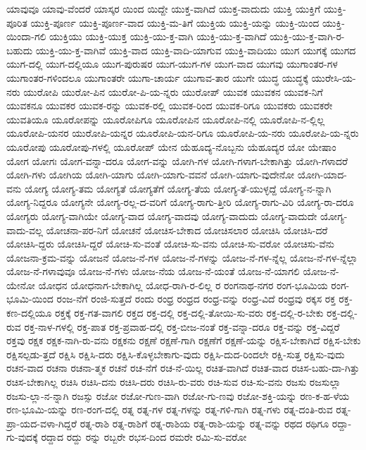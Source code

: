 {ಯಾವುವೂ
ಯಾವು-ವೆಂದರೆ
ಯಾಸ್ಕರ
ಯಿಂದ
ಯಿದ್ದೇ
ಯುಕ್ತ-ವಾಗಿದೆ
ಯುಕ್ತ-ವಾದುದು
ಯುಕ್ತಿ
ಯುಕ್ತಿಗೆ
ಯುಕ್ತಿ-ಪೂರಿತ
ಯುಕ್ತಿ-ಪೂರ್ಣ
ಯುಕ್ತಿ-ಪೂರ್ಣ-ವಾದ
ಯುಕ್ತಿ-ಮ-ತಿಗೆ
ಯುಕ್ತಿಯ
ಯುಕ್ತಿ-ಯನ್ನು
ಯುಕ್ತಿ-ಯಿಂದ
ಯುಕ್ತಿ-ಯಿಂದಾ-ಗಲಿ
ಯುಕ್ತಿಯು
ಯುಕ್ತಿ-ಯುಕ್ತ
ಯುಕ್ತಿ-ಯು-ಕ್ತ-ವಾಗಿ
ಯುಕ್ತಿ-ಯು-ಕ್ತ-ವಾಗಿದೆ
ಯುಕ್ತಿ-ಯು-ಕ್ತ-ವಾಗಿ-ರ-ಬಹುದು
ಯುಕ್ತಿ-ಯು-ಕ್ತ-ವಾಗಿವೆ
ಯುಕ್ತಿ-ವಾದ
ಯುಕ್ತಿ-ವಾದಿ-ಯಾಗುವ
ಯುಕ್ತಿ-ವಾದಿಯು
ಯುಗ
ಯುಗಕ್ಕೆ
ಯುಗದ
ಯುಗ-ದಲ್ಲಿ
ಯುಗ-ದಲ್ಲಿಯೂ
ಯುಗ-ಪುರುಷರ
ಯುಗ-ಯುಗ-ಗಳ
ಯುಗ-ವಾದ
ಯುಗವು
ಯುಗಾಂತರ-ಗಳ
ಯುಗಾಂತರ-ಗಳಿಂದಲೂ
ಯುಗಾಂತರೇ
ಯುಗಾ-ಚಾರ್ಯ
ಯುಗಾವ-ತಾರ
ಯುಗೇ
ಯುದ್ಧ
ಯುದ್ಧಕ್ಕೆ
ಯುರೇಸಿ-ಯ-ನರು
ಯುರೋಪಿ
ಯುರೋ-ಪಿನ
ಯುರೋ-ಪಿ-ಯ-ನ್ನರು
ಯುರೋಪ್
ಯುವಕ
ಯುವಕನ
ಯುವಕ-ನಿಗೆ
ಯುವಕನೂ
ಯುವಕರ
ಯುವಕ-ರನ್ನು
ಯುವಕ-ರಲ್ಲಿ
ಯುವಕ-ರಿಂದ
ಯುವಕ-ರಿಗೂ
ಯುವಕರು
ಯುವಕರೇ
ಯುವತಿಯೂ
ಯೂರೋಪನ್ನು
ಯೂರೋಪಿಗೂ
ಯೂರೋಪಿನ
ಯೂರೋಪಿ-ನಲ್ಲಿ
ಯೂರೋಪಿ-ನ-ಲ್ಲಿಲ್ಲ
ಯೂರೋಪಿ-ಯನರ
ಯುರೋಪಿ-ಯನ್ನರ
ಯೂರೋಪಿ-ಯನ-ರಿಗೂ
ಯೂರೋಪಿ-ಯ-ನರು
ಯೂರೋಪಿ-ಯ-ನ್ನರು
ಯೂರೋಪು
ಯೂರೋಪು-ಗಳಲ್ಲಿ
ಯೂರೋಪ್
ಯೇನ
ಯೆಹೂದ್ಯ-ನೊಬ್ಬನು
ಯೆಹೂದ್ಯರ
ಯೋ
ಯೇಷಾಂ
ಯೋಗ
ಯೋಗಃ
ಯೋಗ-ವನ್ನಾ-ದರೂ
ಯೋಗ-ವನ್ನು
ಯೋಗಿ-ಗಳ
ಯೋಗಿ-ಗಳಾಗ-ಬೇಕಾಗಿತ್ತು
ಯೋಗಿ-ಗಳಾದರೆ
ಯೋಗಿ-ಗಳು
ಯೋಗಿಯ
ಯೋಗಿ-ಯಾಗು
ಯೋಗಿ-ಯಾಗು-ವವನೆ
ಯೋಗಿ-ಯಾಗು-ವುದೇನೋ
ಯೋಗಿ-ಯಾದ-ವನು
ಯೋಗ್ಯ
ಯೋಗ್ಯ-ತಮ
ಯೋಗ್ಯತೆ
ಯೋಗ್ಯತೆಗೆ
ಯೋಗ್ಯ-ತೆಯ
ಯೋಗ್ಯ-ತೆ-ಯುಳ್ಳದ್ದೆ
ಯೋಗ್ಯ-ನ-ನ್ನಾಗಿ
ಯೋಗ್ಯ-ನಿದ್ದರೂ
ಯೋಗ್ಯನೇ
ಯೋಗ್ಯ-ರಲ್ಲ-ದ-ವರಿಗೆ
ಯೋಗ್ಯ-ರಾಗು-ತ್ತೀರಿ
ಯೋಗ್ಯ-ರಾಗು-ವಿರಿ
ಯೋಗ್ಯ-ರಾ-ದರೂ
ಯೋಗ್ಯರು
ಯೋಗ್ಯ-ವಾಗಿಯೇ
ಯೋಗ್ಯ-ವಾದ
ಯೋಗ್ಯ-ವಾದವು
ಯೋಗ್ಯ-ವಾದುದು
ಯೋಗ್ಯ-ವಾದುದೇ
ಯೋಗ್ಯ-ವಾದು-ವಲ್ಲ
ಯೋಚನಾ-ಪರ-ನಿಗೆ
ಯೋಚನೆ
ಯೋಚಿಸ-ಬೇಕಾದ
ಯೋಚಿಸಲಾರ
ಯೋಚಿಸಿ
ಯೋಚಿಸಿ-ದರೆ
ಯೋಚಿಸಿ-ದ್ದರು
ಯೋಚಿಸಿ-ದ್ದರೆ
ಯೋಚಿ-ಸು-ವಂತೆ
ಯೋಚಿ-ಸು-ವನು
ಯೋಚಿ-ಸು-ವರೋ
ಯೋಚಿಸು-ವೆನು
ಯೋಜನಾ-ಕ್ರಮ-ವನ್ನು
ಯೋಜನೆ
ಯೋಜ-ನೆ-ಗಳ
ಯೋಜ-ನೆ-ಗಳನ್ನು
ಯೋಜ-ನೆ-ಗಳ-ನ್ನೆಲ್ಲ
ಯೋಜ-ನೆ-ಗಳ-ನ್ನೆಲ್ಲಾ
ಯೋಜ-ನೆ-ಗಳಾವುವೂ
ಯೋಜ-ನೆ-ಗಳು
ಯೋಜ-ನೆಯ
ಯೋಜ-ನೆ-ಯಂತೆ
ಯೋಜ-ನೆ-ಯಾಗಲಿ
ಯೋಜ-ನೆ-ಯೇನೋ
ಯೋಧನ
ಯೋಧನಾಗ-ಬೇಕಾಗಿಲ್ಲ
ಯೋಧ-ರಾಗಿ-ರ-ಲಿಲ್ಲ
ರ
ರಂಗನಾಥ-ನಗರ
ರಂಗ-ಭೂಮಿಯ
ರಂಗ-ಭೂಮಿ-ಯಿಂದ
ರಂಜ-ನೆಗೆ
ರಂಜಿ-ಸುತ್ತದೆ
ರಂದು
ರಂಧ್ರ
ರಂಧ್ರದ
ರಂಧ್ರ-ವನ್ನು
ರಂಧ್ರ-ವಿದೆ
ರಂಧ್ರವು
ರಕ್ಕಸ
ರಕ್ತ
ರಕ್ತ-ಕಣ-ದಲ್ಲಿಯೂ
ರಕ್ತಕ್ಕೆ
ರಕ್ತ-ಗತ-ವಾಗಲಿ
ರಕ್ತದ
ರಕ್ತ-ದಲ್ಲಿ
ರಕ್ತ-ದಲ್ಲಿ-ತೋಯಿ-ಸು-ವರು
ರಕ್ತ-ದಲ್ಲಿ-ರ-ಬೇಕು
ರಕ್ತ-ದಲ್ಲಿ-ರುವ
ರಕ್ತ-ನಾಳ-ಗಳಲ್ಲಿ
ರಕ್ತ-ಪಾತ
ರಕ್ತ-ಪ್ರವಾಹ-ದಲ್ಲಿ
ರಕ್ತ-ಬೀಜ-ನಂತೆ
ರಕ್ತ-ವನ್ನಾ-ದರೂ
ರಕ್ತ-ವನ್ನು
ರಕ್ತ-ವಿದ್ದರೆ
ರಕ್ತವು
ರಕ್ಷಕ
ರಕ್ಷಕ-ನಾಗಿ-ರು-ವನು
ರಕ್ಷಕನು
ರಕ್ಷಣೆ
ರಕ್ಷಣೆ-ಗಾಗಿ
ರಕ್ಷಣೆಗೆ
ರಕ್ಷಣೆ-ಯನ್ನು
ರಕ್ಷಿಸ-ಬೇಕಾಗಿದೆ
ರಕ್ಷಿಸ-ಬೇಕು
ರಕ್ಷಿಸಲ್ಪಡು-ತ್ತದೆ
ರಕ್ಷಿಸಿ
ರಕ್ಷಿಸಿ-ದರು
ರಕ್ಷಿಸಿ-ಕೊಳ್ಳಬೇಕಾಗು-ವುದು
ರಕ್ಷಿಸಿ-ದುದ-ರಿಂದಲೇ
ರಕ್ಷಿ-ಸುತ್ತ
ರಕ್ಷಿಸು-ವುದು
ರಚನ-ವಾದ
ರಚನಾ
ರಚನಾ-ತ್ಮಕ
ರಚನೆ
ರಚ-ನೆಗೆ
ರಚ-ನೆ-ಯಿಲ್ಲ
ರಚಿತ-ವಾಗಿದೆ
ರಚಿತ-ವಾದ
ರಚಿಸ-ಬಹು-ದಾ-ಗಿತ್ತು
ರಚಿಸ-ಬೇಕಾಗಿಲ್ಲ
ರಚಿಸಿ
ರಚಿಸಿ-ದನು
ರಚಿಸಿ-ದರು
ರಚಿಸಿ-ರು-ವರು
ರಚಿ-ಸುವ
ರಚಿ-ಸು-ವನು
ರಜಸು
ರಜಸುಲ್ಲಾ
ರಜಸು-ಲ್ಲಾ-ನ-ನ್ನಾಗಿ
ರಜಸ್ಸು
ರಜೋ
ರಜೋ-ಗುಣ-ವಾಗಿ
ರಜೋ-ಗು-ಣವು
ರಜೋ-ಶಕ್ತಿ-ಯನ್ನು
ರಣ-ಕ-ಹ-ಳೆಯ
ರಣ-ಭೂಮಿ-ಯನ್ನು
ರಣ-ರಂಗ-ದಲ್ಲಿ
ರತ್ನ
ರತ್ನ-ಗಳ
ರತ್ನ-ಗಳನ್ನು
ರತ್ನ-ಗಳಿ-ಗಾಗಿ
ರತ್ನ-ಗಳು
ರತ್ನ-ದಂತಿ-ರುವ
ರತ್ನ-ಪ್ರಾ-ಯದ-ವಳಾ-ಗಿದ್ದರೆ
ರತ್ನ-ರಾಶಿ
ರತ್ನ-ರಾಶಿಗೆ
ರತ್ನ-ರಾಶಿಯ
ರತ್ನ-ರಾಶಿ-ಯನ್ನು
ರತ್ನ-ವನ್ನು
ರಥದ
ರಥಿಗೂ
ರದ್ದಾ-ಗು-ವುದಕ್ಕೆ
ರದ್ದಾದ
ರದ್ದು
ರನ್ನು
ರಬ್ಬರೇ
ರಭಸ-ದಿಂದ
ರಮರೇ
ರಮಿ-ಸು-ವರೋ
}
